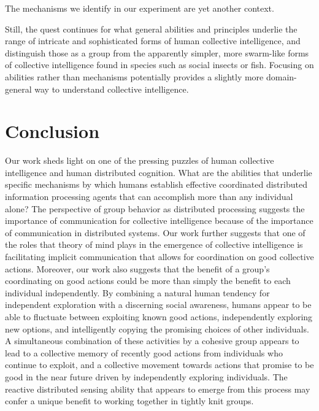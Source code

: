 \documentclass[12pt,letterpaper]{article}
\begin{document}
The mechanisms we identify in our experiment are yet another context.

Still, the quest continues for what general abilities and principles underlie the range of intricate and sophisticated forms of human collective intelligence, and distinguish those as a group from the apparently simpler, more swarm-like forms of collective intelligence found in species such as social insects or fish.  Focusing on abilities rather than mechanisms potentially provides a slightly more domain-general way to understand collective intelligence.

\section{Conclusion}

Our work sheds light on one of the pressing puzzles of
human collective intelligence and human distributed cognition.  What
are the abilities that underlie specific mechanisms by which humans establish effective
coordinated distributed information processing agents that can
accomplish more than any individual alone?  The perspective of group behavior as
distributed processing \cite{hutchins_cognition_1995} suggests the
importance of communication for collective intelligence because of the
importance of communication in distributed systems.  
Our work further
suggests that one of the roles that theory of mind plays in the
emergence of collective intelligence is facilitating implicit
communication that allows for coordination on good collective actions.
Moreover, our work also suggests that the benefit of a group's
coordinating on good actions could be more than simply the benefit to
each individual independently.  By combining a natural human tendency
for independent exploration with a discerning social awareness, humans
appear to be able to fluctuate between exploiting known good actions,
independently exploring new options, and intelligently copying the
promising choices of other individuals.  A simultaneous combination of
these activities by a cohesive group appears to lead to a collective
memory of recently good actions from individuals who continue to
exploit, and a collective movement towards actions that promise to be
good in the near future driven by independently exploring individuals.
The reactive distributed sensing ability that appears to emerge from
this process may confer a unique benefit to working together in
tightly knit groups.
\end{document}
